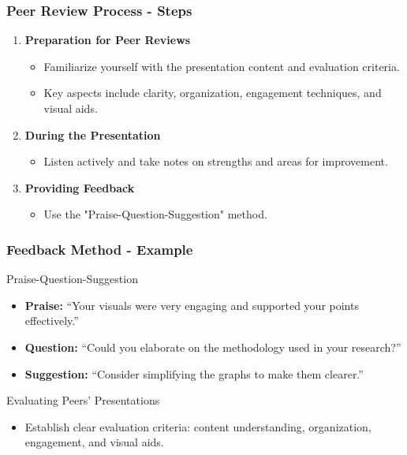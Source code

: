 \documentclass{beamer}
\begin{document}
\begin{frame}[fragile]
    \frametitle{Peer Review Process - Steps}
    \begin{enumerate}
        \item \textbf{Preparation for Peer Reviews}
            \begin{itemize}
                \item Familiarize yourself with the presentation content and evaluation criteria.
                \item Key aspects include clarity, organization, engagement techniques, and visual aids.
            \end{itemize}
        
        \item \textbf{During the Presentation}
            \begin{itemize}
                \item Listen actively and take notes on strengths and areas for improvement.
            \end{itemize}

        \item \textbf{Providing Feedback}
            \begin{itemize}
                \item Use the "Praise-Question-Suggestion" method.
            \end{itemize}
    \end{enumerate}
\end{frame}

\begin{frame}[fragile]
    \frametitle{Feedback Method - Example}
    \begin{block}{Praise-Question-Suggestion}
        \begin{itemize}
            \item \textbf{Praise:} “Your visuals were very engaging and supported your points effectively.”
            \item \textbf{Question:} “Could you elaborate on the methodology used in your research?”
            \item \textbf{Suggestion:} “Consider simplifying the graphs to make them clearer.”
        \end{itemize}
    \end{block}

    \begin{block}{Evaluating Peers' Presentations}
        \begin{itemize}
            \item Establish clear evaluation criteria: content understanding, organization, engagement, and visual aids.
        \end{itemize}
    \end{block}
\end{frame}
\end{document}
